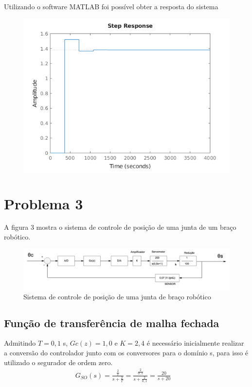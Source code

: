 \documentclass[a4paper,12pt]{article}
\begin{document}
		Utilizando o software MATLAB foi possível obter a resposta do sistema
		
		\begin{figure}[H]
			\centering
			\includegraphics[width=0.5\linewidth]{images/resp2g.png}
			\label{fig:resposta_g}
		\end{figure}


\section{Problema 3}
A figura 3 mostra o sistema de controle de posição de uma junta de um braço robótico.
\begin{figure}[H]
	\centering
	\includegraphics[width=0.9\linewidth]{images/planta_problema3}
	\caption{Sistema de controle de posição de uma junta de braço robótico}
	\label{fig:plantaproblema3}
\end{figure}

\subsection{Função de transferência de malha fechada}
Admitindo $T = 0,1$ s, $Gc(z) = 1,0$ e $K=2,4$ é necessário inicialmente realizar a conversão do controlador junto com os conversores para o domínio s, para isso é utilizado o segurador de ordem zero.
	\begin{equation}
		\left.
		\begin{array}{c}
			\displaystyle G_{SO}(s) = \frac{\displaystyle \frac{2}{T}}{s+\displaystyle\frac{2}{T}} = \frac{\displaystyle \frac{2}{0,1}}{s+\displaystyle\frac{2}{0,1}} = \frac{20}{s+20}
		\end{array}
		\right.
		\quad 
	\end{equation}
	
\end{document}
